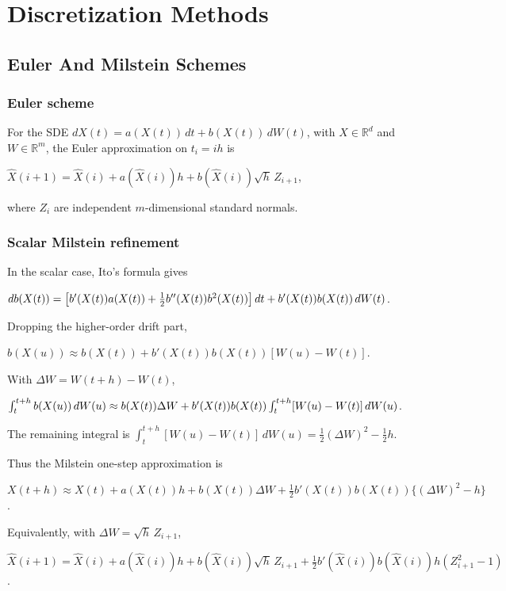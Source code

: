 \section{Discretization Methods}

\subsection{Euler And Milstein Schemes}

\subsubsection*{Euler scheme}

For the SDE $dX(t)=a(X(t))\,dt+b(X(t))\,dW(t)$, with $X\in\mathbb{R}^d$ and $W\in\mathbb{R}^m$, the Euler approximation on $t_i=ih$ is

$\hat X(i+1)=\hat X(i)+a(\hat X(i))h+b(\hat X(i))\sqrt h\,Z_{i+1}$,

where $Z_i$ are independent $m$-dimensional standard normals. 

\subsubsection*{Scalar Milstein refinement}

In the scalar case, Ito's formula gives

$db(X(t))=\left[b'(X(t))a(X(t))+\frac12 b''(X(t))b^2(X(t))\right]dt
\\+b'(X(t))b(X(t))\,dW(t)$.

Dropping the higher-order drift part,

$b(X(u))\approx b(X(t))+b'(X(t))b(X(t))[W(u)-W(t)]$.

With $\Delta W=W(t+h)-W(t)$,

$\int_t^{t+h}b(X(u))\,dW(u)\approx b(X(t))\Delta W+
\\b'(X(t))b(X(t))\int_t^{t+h}[W(u)-W(t)]\,dW(u)$.

The remaining integral is
$\int_t^{t+h}[W(u)-W(t)]\,dW(u)=\frac12(\Delta W)^2-\frac12h$.

Thus the Milstein one-step approximation is

$X(t+h)\approx X(t)+a(X(t))h+b(X(t))\Delta W+\frac12b'(X(t))b(X(t))\{(\Delta W)^2-h\}$.

Equivalently, with $\Delta W=\sqrt h\,Z_{i+1}$,

$\hat X(i+1)=\hat X(i)+a(\hat X(i))h+b(\hat X(i))\sqrt h\,Z_{i+1}+\frac12 b'(\hat X(i))b(\hat X(i))h(Z_{i+1}^2-1)$.

